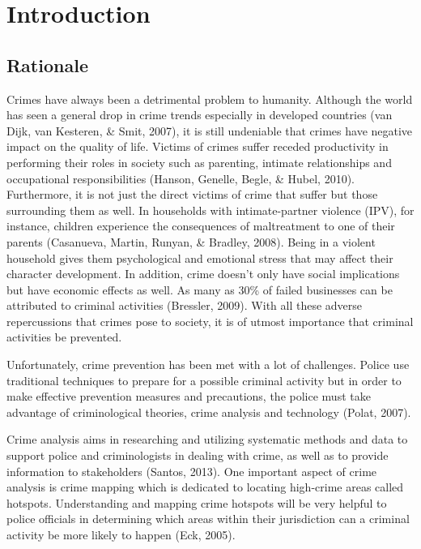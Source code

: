 
\chapter{Introduction}  %

\section{Rationale} %

    Crimes have always been a detrimental problem to humanity. Although the world has seen a general drop in crime trends especially in developed countries (van Dijk, van Kesteren, \& Smit, 2007), it is still undeniable that crimes have negative impact on the quality of life. Victims of crimes suffer receded productivity in performing their roles in society such as parenting, intimate relationships and occupational responsibilities (Hanson, Genelle, Begle, \& Hubel, 2010). Furthermore, it is not just the direct victims of crime that suffer but those surrounding them as well. In households with intimate-partner violence (IPV), for instance, children experience the consequences of maltreatment to one of their parents (Casanueva, Martin, Runyan, \& Bradley, 2008). Being in a violent household gives them psychological and emotional stress that may affect their character development. In addition, crime doesn’t only have social implications but have economic effects as well. As many as 30\% of failed businesses can be attributed to criminal activities (Bressler, 2009). With all these adverse repercussions that crimes pose to society, it is of utmost importance that criminal activities be prevented.

    Unfortunately, crime prevention has been met with a lot of challenges. Police use traditional techniques to prepare for a possible criminal activity but in order to make effective prevention measures and precautions, the police must take advantage of criminological theories, crime analysis and technology (Polat, 2007).

    Crime analysis aims in researching and utilizing systematic methods and data to support police and criminologists in dealing with crime, as well as to provide information to stakeholders (Santos, 2013). One important aspect of crime analysis is crime mapping which is dedicated to locating high-crime areas called hotspots. Understanding and mapping crime hotspots will be very helpful to police officials in determining which areas within their jurisdiction can a criminal activity be more likely to happen (Eck, 2005).

